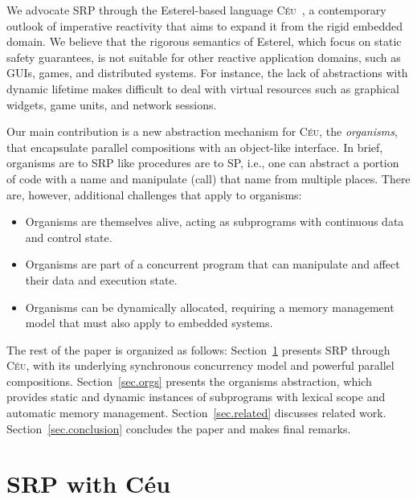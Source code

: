 \documentclass{acm_proc_article-sp}
\newcommand{\CEU}{\textsc{C\'{e}u}\xspace}
\newcommand{\1}{\;}
\newcommand{\2}{\;\;}
\newcommand{\3}{\;\;\;}
\newcommand{\5}{\;\;\;\;\;}
\begin{document}
We advocate SRP through the Esterel-based language \CEU~\cite{ceu.sensys13}, a 
contemporary outlook of imperative reactivity that aims to expand it from the 
rigid embedded domain.
%
%
We believe that the rigorous semantics of Esterel, which focus on static safety 
guarantees, is not suitable for other reactive application domains, such as 
GUIs, games, and distributed systems.
%
For instance, the lack of abstractions with dynamic lifetime makes difficult to 
deal with virtual resources such as graphical widgets, game units, and network 
sessions.

Our main contribution is a new abstraction mechanism for \CEU, the 
\emph{organisms}, that encapsulate parallel compositions with an object-like 
interface.
%
In brief, organisms are to SRP like procedures are to SP, i.e., one can 
abstract a portion of code with a name and manipulate (call) that name from 
multiple places.
%
There are, however, additional challenges that apply to organisms:
%
\begin{itemize}
\item Organisms are themselves alive, acting as subprograms with continuous 
data and control state.
\item Organisms are part of a concurrent program that can manipulate and affect 
their data and execution state.
\item Organisms can be dynamically allocated, requiring a memory management 
model that must also apply to embedded systems.
\end{itemize}

The rest of the paper is organized as follows:
Section~\ref{sec.ceu} presents SRP through \CEU, with its underlying 
synchronous concurrency model and powerful parallel compositions.
Section~\ref{sec.orgs} presents the organisms abstraction, which provides 
static and dynamic instances of subprograms with lexical scope and automatic 
memory management.
Section~\ref{sec.related} discusses related work.
Section~\ref{sec.conclusion} concludes the paper and makes final remarks.

\section{SRP with C\'eu}
\label{sec.ceu}
\end{document}
